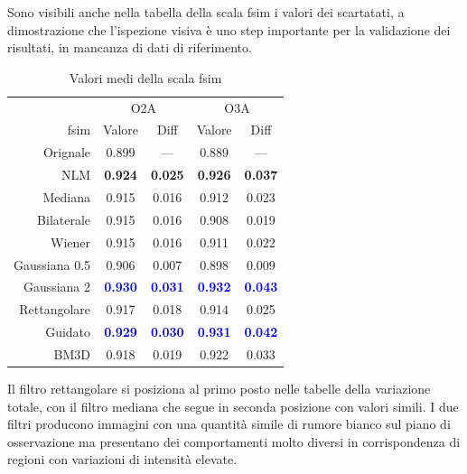\documentclass[../main.tex]{subfiles}
\begin{document}
Sono visibili anche nella tabella della scala \acrshort{fsim} i valori dei scartatati, a dimostrazione che l'ispezione visiva è uno step importante per la validazione dei risultati, in mancanza di dati di  riferimento.\medskip

\begin{table}[ht]
	\centering
	\begin{tabular}{r||cc|cc}
		&  \multicolumn{2}{c|}{O2A} &  \multicolumn{2}{c}{O3A}  \\
		\acrshort{fsim}\hspace{10pt} & Valore & Diff & Valore & Diff \\		\hline\hline
		Orignale   		& 0.899 & ---   & 0.889 & --- \\
		NLM         	& \textbf{0.924} & \textbf{0.025} & \textbf{0.926} & \textbf{0.037} \\
		Mediana     	& 0.915 & 0.016 & 0.912 & 0.023 \\
		Bilaterale    	& 0.915 & 0.016 & 0.908 & 0.019 \\
		Wiener        	& 0.915 & 0.016 & 0.911 & 0.022 \\
		Gaussiana 0.5 	& 0.906 & 0.007 & 0.898 & 0.009 \\
		Gaussiana 2   	& \textcolor{blue}{\textbf{0.930}} & \textcolor{blue}{\textbf{0.031}} & \textcolor{blue}{\textbf{0.932}} & \textcolor{blue}{\textbf{0.043}} \\
		Rettangolare 	& 0.917 & 0.018 & 0.914 & 0.025 \\
		Guidato        	& \textcolor{blue}{\textbf{0.929}} & \textcolor{blue}{\textbf{0.030}} & \textcolor{blue}{\textbf{0.931}} & \textcolor{blue}{\textbf{0.042}} \\
		BM3D   			& 0.918 & 0.019     & 0.922 & 0.033
	\end{tabular}
	\caption[Valori medi della scala FSIM]{
		Valori medi della scala \acrshort{fsim}}
\end{table}

Il filtro rettangolare si posiziona al primo posto nelle tabelle della variazione totale, con il filtro mediana che segue in seconda posizione con valori simili. I due filtri producono immagini con una quantità simile di rumore bianco sul piano di osservazione ma presentano dei comportamenti molto diversi in corrispondenza di regioni con variazioni di intensità elevate.\bigskip
\end{document}

